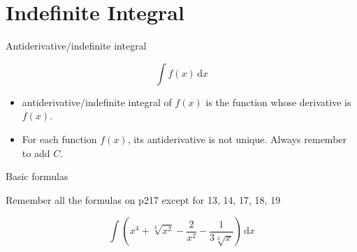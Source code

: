 \section[IndefInt]{Indefinite Integral}
\begin{frame}{Antiderivative/indefinite integral}


\[
\int f\left(x\right)\,\mathrm{d}x
\]



\pause{}
\begin{itemize}
\item antiderivative/indefinite integral of $f\left(x\right)$ is the function
whose derivative is $f\left(x\right)$.
\item For each function $f\left(x\right)$, its antiderivative is not unique.
\alert{Always remember to add $C$}.
\end{itemize}
\end{frame}

\begin{frame}{Basic formulas}


Remember all the formulas on p217 except for 13, 14, 17, 18, 19
\begin{example}
\[
\int\left(x^{4}+\sqrt[3]{x^{2}}-\frac{2}{x^{2}}-\frac{1}{3\sqrt[3]{x}}\right)\,\mathrm{d}x
\]

\end{example}

\end{frame}

